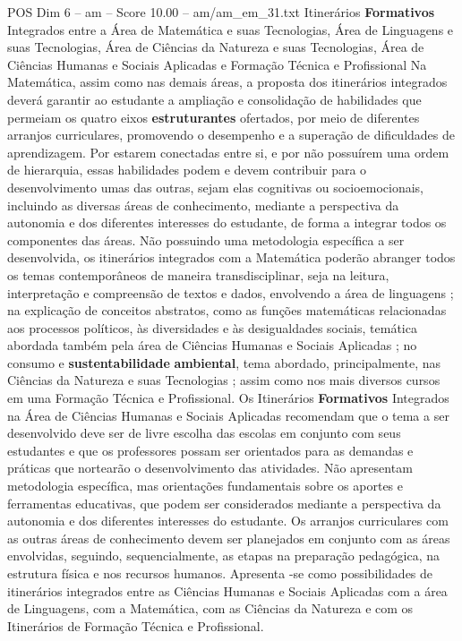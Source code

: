 \begin{textsample}{POS Dim 6 – am – Score 10.00 – am/am\_em\_31.txt}
Itinerários \textbf{Formativos} Integrados entre a Área de Matemática e suas Tecnologias, Área de Linguagens e suas Tecnologias, Área de Ciências da Natureza e suas Tecnologias, Área de Ciências Humanas e Sociais Aplicadas e Formação Técnica e Profissional Na Matemática, assim como nas demais áreas, a proposta dos itinerários integrados deverá garantir ao estudante a ampliação e consolidação de habilidades que permeiam os quatro eixos \textbf{estruturantes} ofertados, por meio de diferentes arranjos curriculares, promovendo o desempenho e a superação de dificuldades de aprendizagem.
Por estarem conectadas entre si, e por não possuírem uma ordem de hierarquia, essas habilidades podem e devem contribuir para o desenvolvimento umas das outras, sejam elas cognitivas ou socioemocionais, incluindo as diversas áreas de conhecimento, mediante a perspectiva da autonomia e dos diferentes interesses do estudante, de forma a integrar todos os componentes das áreas.
Não possuindo uma metodologia específica a ser desenvolvida, os itinerários integrados com a Matemática poderão abranger todos os temas contemporâneos de maneira transdisciplinar, seja na leitura, interpretação e compreensão de textos e dados, envolvendo a área de linguagens ; na explicação de conceitos abstratos, como as funções matemáticas relacionadas aos processos políticos, às diversidades e às desigualdades sociais, temática abordada também pela área de Ciências Humanas e Sociais Aplicadas ; no consumo e \textbf{sustentabilidade} \textbf{ambiental}, tema abordado, principalmente, nas Ciências da Natureza e suas Tecnologias ; assim como nos mais diversos cursos em uma Formação Técnica e Profissional.
Os Itinerários \textbf{Formativos} Integrados na Área de Ciências Humanas e Sociais Aplicadas recomendam que o tema a ser desenvolvido deve ser de livre escolha das escolas em conjunto com seus estudantes e que os professores possam ser orientados para as demandas e práticas que nortearão o desenvolvimento das atividades.
Não apresentam metodologia específica, mas orientações fundamentais sobre os aportes e ferramentas educativas, que podem ser considerados mediante a perspectiva da autonomia e dos diferentes interesses do estudante.
Os arranjos curriculares com as outras áreas de conhecimento devem ser planejados em conjunto com as áreas envolvidas, seguindo, sequencialmente, as etapas na preparação pedagógica, na estrutura física e nos recursos humanos.
Apresenta -se como possibilidades de itinerários integrados entre as Ciências Humanas e Sociais Aplicadas com a área de Linguagens, com a Matemática, com as Ciências da Natureza e com os Itinerários de Formação Técnica e Profissional.

\end{textsample}
